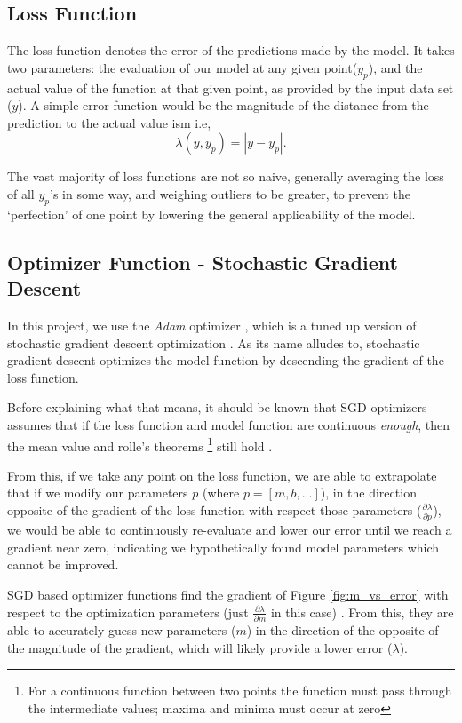 \documentclass[titlepage,letterpaper]{article}
\begin{document}
\subsection{Loss Function}

The loss function denotes the error of the predictions made by the model. It takes two parameters: the evaluation of our model at any given point($y_p$), and the actual value of the function at that given point, as provided by the input data set ($y$). A simple error function would be the magnitude of the distance from the prediction to the actual value ism i.e,
\[\lambda(y,y_p) =  |y - y_p|. \]

The vast majority of loss functions are not so naive, generally averaging the loss of all $y_p$'s in some way, and weighing outliers to be greater, to prevent the `perfection' of one point by lowering the general applicability of the model.

\subsection{Optimizer Function - Stochastic Gradient Descent}

In this project, we use the \textit{Adam} optimizer \cite{adam}, which is a tuned up version of stochastic gradient descent optimization \cite{adam}. As its name alludes to, stochastic gradient descent optimizes the model function by descending the gradient of the loss function. 

Before explaining what that means, it should be known that SGD optimizers assumes that if the loss function and model function are continuous \textit{enough}, then the mean value and rolle’s theorems \footnote{For a continuous function between two points the function must pass through the intermediate values; maxima and minima must occur at zero} still hold \cite{EMA}. 

From this, if we take any point on the loss function, we are able to extrapolate that if we modify our parameters $p$ (where $p = [m, b,...]$), in the direction opposite of the gradient of the loss function with respect those parameters ($\frac{\partial\lambda}{\partial p}$), we would be able to continuously re-evaluate and lower our error until we reach a gradient near zero, indicating we hypothetically found model parameters which cannot be improved.

SGD based optimizer functions find the gradient of Figure \ref{fig:m_vs_error} with respect to the optimization parameters (just $\frac{\partial\lambda}{\partial m}$ in this case) \cite{EMA}. From this, they are able to accurately guess new parameters ($m$) in the direction of the opposite of the magnitude of the gradient, which will likely provide a lower error ($\lambda$). 
\end{document}
